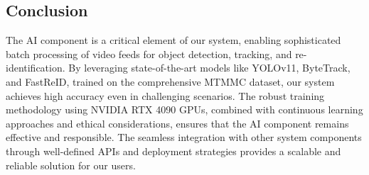 \subsection{Conclusion}
\label{subsection:conclusion}

The AI component is a critical element of our system, enabling sophisticated batch processing of video feeds for object detection, tracking, and re-identification. By leveraging state-of-the-art models like YOLOv11, ByteTrack, and FastReID, trained on the comprehensive MTMMC dataset, our system achieves high accuracy even in challenging scenarios. The robust training methodology using NVIDIA RTX 4090 GPUs, combined with continuous learning approaches and ethical considerations, ensures that the AI component remains effective and responsible. The seamless integration with other system components through well-defined APIs and deployment strategies provides a scalable and reliable solution for our users.